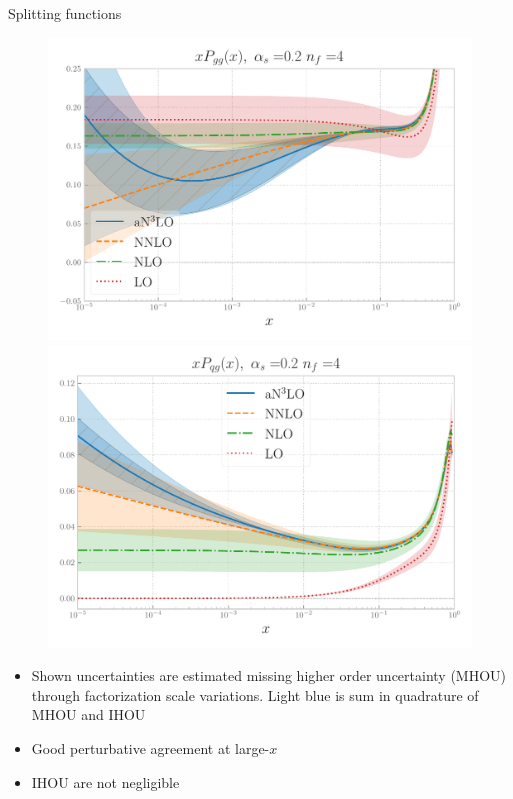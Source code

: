 \documentclass[aspectratio=169, 9pt,t]{beamer}
\begin{document}
\begin{frame}{Splitting functions}
  \begin{figure}
    \centering
    \includegraphics[width=.4\textwidth]{figures/gamma_gg_totu_logx.pdf}
    \includegraphics[width=.4\textwidth]{figures/gamma_qg_totu_logx.pdf}
  \end{figure}
  \begin{itemize}
    \item Shown uncertainties are estimated missing higher order uncertainty (MHOU) through factorization scale variations. Light blue is sum in quadrature of MHOU and IHOU
    \item Good perturbative agreement at large-$x$
    \item IHOU are not negligible
  \end{itemize}
\end{frame}
\end{document}
